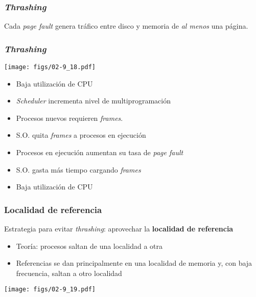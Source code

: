 \documentclass[letter]{beamer}
\begin{document}
\begin{frame}
  \frametitle{{\em Thrashing}}

  Cada {\em page fault} genera tráfico entre disco y memoria de {\em al menos} una página.
  
  \vspace{1em}

  \vspace{1em}        


\end{frame}
\begin{frame}
  \frametitle{{\em Thrashing}}

  \begin{center}
    \texttt{[image: figs/02-9\_18.pdf]}
  \end{center}

  \begin{itemize}
    \item Baja utilización de CPU
    \item {\em Scheduler} incrementa nivel de multiprogramación
    \item Procesos nuevos requieren {\em frames}.
    \item S.O. quita {\em frames} a procesos en ejecución
    \item Procesos en ejecución aumentan su tasa de {\em page fault}
    \item S.O. gasta más tiempo cargando {\em frames}
    \item Baja utilización de CPU
  \end{itemize}

\end{frame}

\begin{frame}
  \frametitle{Localidad de referencia}

  Estrategia para evitar {\em thrashing}: aprovechar la {\bf localidad de referencia}
  
  \begin{itemize}
    \item Teoría: procesos saltan de una localidad a otra
    \item Referencias se dan principalmente en una localidad de memoria y,
          con baja frecuencia, saltan a otro localidad
  \end{itemize}
  
  \begin{center}
    \texttt{[image: figs/02-9\_19.pdf]}
  \end{center}


\end{frame}
\end{document}
